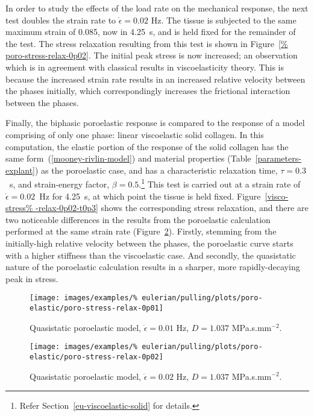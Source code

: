In order to study the effects of the load rate on the mechanical
response, the next test doubles the strain rate to $\dot{\epsilon} =
0.02$ Hz. The tissue is subjected to the same maximum strain of 0.085,
now in 4.25~s, and is held fixed for the remainder of the test. The
stress relaxation resulting from this test is shown in Figure~\ref{%
  poro-stress-relax-0p02}. The initial peak stress is now increased;
an observation which is in agreement with classical results in
viscoelasticity theory. This is because the increased strain rate
results in an increased relative velocity between the phases
initially, which correspondingly increases the frictional interaction
between the phases.

Finally, the biphasic poroelastic response is compared to the response
of a model comprising of only one phase: linear viscoelastic solid
collagen. In this computation, the elastic portion of the response of
the solid collagen has the same form~(\ref{mooney-rivlin-model}) and
material properties (Table~\ref{parameters-explant}) as the
poroelastic case, and has a characteristic relaxation time,
$\tau=0.3$~s, and strain-energy factor, $\beta=0.5$.\footnote{Refer
  Section~\ref{eu-viscoelastic-solid} for details.} This test is
carried out at a strain rate of $\dot{\epsilon}=0.02$~Hz for 4.25~s,
at which point the tissue is held fixed. Figure~\ref{visco-stress%
  -relax-0p02-t0p3} shows the corresponding stress relaxation, and
there are two noticeable differences in the results from the
poroelastic calculation performed at the same strain rate
(Figure~\ref{poro-stress-relax-0p02}).  Firstly, stemming from the
initially-high relative velocity between the phases, the poroelastic
curve starts with a higher stiffness than the viscoelastic case. And
secondly, the quasistatic nature of the poroelastic calculation
results in a sharper, more rapidly-decaying peak in stress.

\clearpage

\begin{figure}[!hptb]
  \centering
  \texttt{[image: images/examples/\%
    eulerian/pulling/plots/poro-elastic/poro-stress-relax-0p01]}
  \caption{Quasistatic poroelastic model, $\dot{\epsilon}=0.01$ Hz,
    $D=1.037$ MPa.s.mm$^{-2}$.}
  \label{poro-stress-relax-0p01}
\end{figure}

\begin{figure}[!hptb]
  \centering
  \texttt{[image: images/examples/\%
    eulerian/pulling/plots/poro-elastic/poro-stress-relax-0p02]}
  \caption{Quasistatic poroelastic model, $\dot{\epsilon}=0.02$ Hz,
    $D=1.037$ MPa.s.mm$^{-2}$.}
  \label{poro-stress-relax-0p02}
\end{figure}

